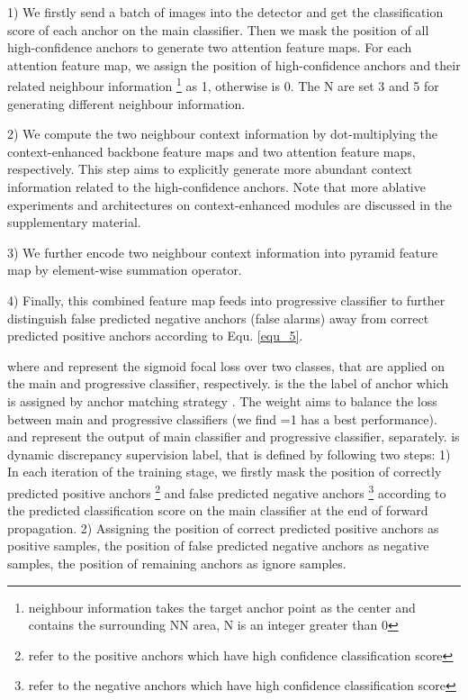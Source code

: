 \documentclass[10pt,twocolumn,letterpaper]{article}
\begin{document}
1) We firstly send a batch of images into the detector and get the classification score of each anchor on the main classifier. Then we mask the position of all high-confidence anchors to generate two attention feature maps. For each attention feature map,  we assign the position of high-confidence  anchors and their related neighbour information \footnote{neighbour information takes the target anchor point as the center and contains the surrounding NN area, N is an integer greater than 0} as 1, otherwise is 0. The N are set 3 and 5 for generating different neighbour information.

2) We compute the two neighbour context information by dot-multiplying the context-enhanced backbone feature maps and  two attention feature maps, respectively. This step aims to explicitly generate more abundant context information related to the high-confidence anchors. Note that more ablative experiments and architectures on context-enhanced modules are discussed in the supplementary material.

3) We further encode two neighbour context information  into  pyramid feature map by element-wise summation operator. 

4) Finally, this combined feature map feeds into   progressive classifier to further distinguish false predicted negative anchors (false alarms)  away from correct predicted positive anchors according to Equ. \ref{equ_5}. 



where  and   represent the sigmoid focal loss \cite{lin2017focal} over two classes, that are applied on the main and progressive classifier, respectively.  is the the label of anchor which is assigned by anchor matching strategy \cite{ren2015faster}. The weight  aims to balance the loss between main and progressive classifiers (we find =1 has a best performance).  and  represent the output of main classifier and progressive classifier, separately.
 is dynamic discrepancy supervision label, that is  defined by following two steps: 1) In each iteration of the training stage, we  firstly  mask  the  position  of correctly predicted positive anchors \footnote{refer to the positive anchors which have high confidence classification score} and false predicted negative anchors \footnote{refer to the negative anchors which have high confidence classification score} according to the predicted  classification score on the main classifier at the end of forward propagation. 2) Assigning the position of  correct predicted positive anchors as positive samples, the position of false predicted negative anchors as  negative samples, the position of remaining anchors as ignore samples.
\end{document}
